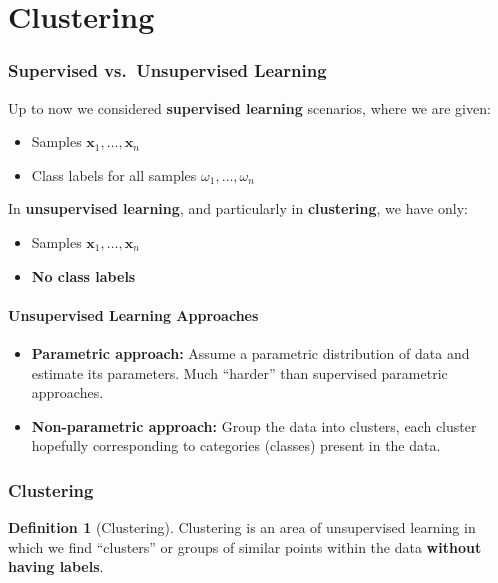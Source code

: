 \documentclass[11pt,a4paper]{article}
\theoremstyle{definition}
\newtheorem{definition}{Definition}[section]
\theoremstyle{plain}
\theoremstyle{remark}
\begin{document}
\newpage

\part{Clustering}

\section{Supervised vs.\ Unsupervised Learning}

Up to now we considered \textbf{supervised learning} scenarios, where we are given:
\begin{itemize}
    \item Samples $\mathbf{x}_1, \ldots, \mathbf{x}_n$
    \item Class labels for all samples $\omega_1, \ldots, \omega_n$
\end{itemize}

In \textbf{unsupervised learning}, and particularly in \textbf{clustering}, we have only:
\begin{itemize}
    \item Samples $\mathbf{x}_1, \ldots, \mathbf{x}_n$
    \item \textbf{No class labels}
\end{itemize}

\subsection{Unsupervised Learning Approaches}

\begin{itemize}
    \item \textbf{Parametric approach:} Assume a parametric distribution of data and estimate its parameters. Much ``harder'' than supervised parametric approaches.
    \item \textbf{Non-parametric approach:} Group the data into clusters, each cluster hopefully corresponding to categories (classes) present in the data.
\end{itemize}

\section{Clustering}

\begin{definition}[Clustering]
Clustering is an area of unsupervised learning in which we find ``clusters'' or groups of similar points within the data \textbf{without having labels}.
\end{definition}
\end{document}

